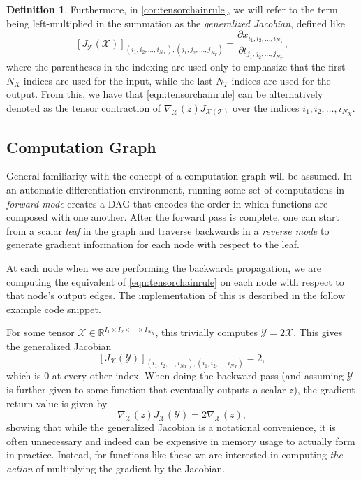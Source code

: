 \documentclass{article}
\newcommand{\tensor}[1]{\bm{{\mathcal{#1}}}}
\newcommand{\gradfn}[2]{\nabla_{{#1}}\left({#2}\right)} %
\newcommand{\jac}[2]{J_{{#1}}\left({#2}\right)} %
\theoremstyle{definition}
\newtheorem{definition}{Definition}[section]
\begin{document}
\begin{definition}
  Furthermore, in \cref{cor:tensorchainrule}, we will refer to the term being left-multiplied in the summation as the \textit{generalized Jacobian}, defined like
  \begin{equation}
    \left[\jac{\tensor{T}}{\tensor{X}}\right]_{\left(i_1, i_2, \ldots, i_{N_X}\right), \left(j_1, j_2, \ldots, j_{N_T}\right)} = \frac{\partial x_{i_1, i_2, \ldots, i_{N_X}}}{\partial t_{j_1, j_2, \ldots, j_{N_T}}}, \label{eqn:jacfn}
  \end{equation}
  where the parentheses in the indexing are used only to emphasize that the first $N_X$ indices are used for the input, while the last $N_T$ indices are used for the output. From this, we have that \cref{eqn:tensorchainrule} can be alternatively denoted as the tensor contraction of $\gradfn{\tensor{X}}{z}J_{\tensor{X}\left(\tensor{T}\right)}$ over the indices $i_1, i_2, \ldots, i_{N_X}$.
\end{definition}

\subsection{Computation Graph}
General familiarity with the concept of a computation graph\cite{pytorch,BaydinPR15} will be assumed.  In an automatic differentiation environment, running some set of computations in \textit{forward mode} creates a DAG that encodes the order in which functions are composed with one another.  After the forward pass is complete, one can start from a scalar \textit{leaf} in the graph and traverse backwards in a \textit{reverse mode} to generate gradient information for each node with respect to the leaf.

At each node when we are performing the backwards propagation, we are computing the equivalent of \cref{eqn:tensorchainrule} on each node with respect to that node's output edges.  The implementation of this is described in the follow example code snippet.



For some tensor $\tensor{X} \in \mathbb{R}^{I_1 \times I_2 \times \cdots \times I_{N_X}}$, this trivially computes $\tensor{Y}=2\tensor{X}$.  This gives the generalized Jacobian
\begin{equation}
  \left[\jac{\tensor{X}}{\tensor{Y}}\right]_{\left(i_1, i_2, \ldots, i_{N_X}\right), \left(i_1, i_2, \ldots, i_{N_X}\right)} = 2,
\end{equation}
which is $0$ at every other index.  When doing the backward pass (and assuming $\tensor{Y}$ is further given to some function that eventually outputs a scalar $z$), the gradient return value is given by
\begin{equation}
 \gradfn{\tensor{X}}{z} \jac{\tensor{X}}{\tensor{Y}} = 2\gradfn{\tensor{X}}{z},
\end{equation}
showing that while the generalized Jacobian is a notational convenience, it is often unnecessary and indeed can be expensive in memory usage to actually form in practice.  Instead, for functions like these we are interested in computing \textit{the action} of multiplying the gradient by the Jacobian.
\end{document}
